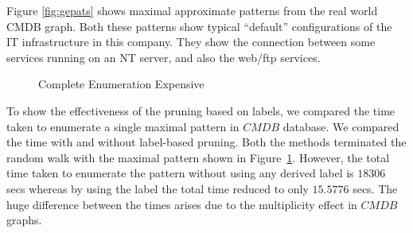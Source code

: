 \smallskip{}
Figure \ref{fig:gepats} shows maximal approximate
patterns from the real world CMDB graph. Both these patterns show
typical ``default'' 
configurations of the IT infrastructure in this company. They show the
connection between some services running on an NT server, and also the
web/ftp services.


\begin{figure}
    \centering
    \caption{Complete Enumeration Expensive}
    \label{fig:geex}
\end{figure}

To show the effectiveness of the pruning based on labels, we compared
the time taken to enumerate a single maximal pattern in $CMDB$ database.
We compared the time with and without label-based pruning.
Both the methods terminated the random walk with the maximal pattern
shown in Figure~\ref{fig:geex}.  
However, the total time taken to enumerate the pattern
without using any derived label is $18306$ secs whereas by using the
\ncl label the total time reduced to only $15.5776$ secs. The huge
difference between the times arises due to the multiplicity effect in
$CMDB$ graphs.  



